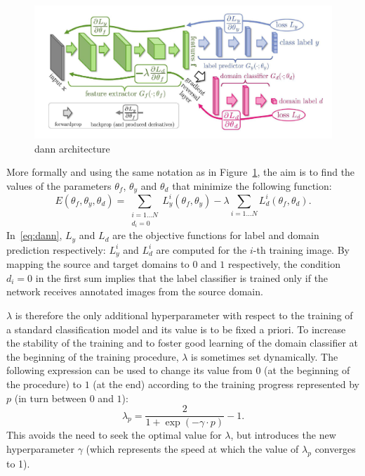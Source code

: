 \documentclass[%
    corpo=12pt,
    twoside,
    stile=classica,   
    tipotesi=magistrale,
    evenboxes,
    english,
	numerazioneromana,
]{toptesi}
\begin{document}
\begin{figure}[ht!]
	\centering
	\includegraphics[width=0.95\linewidth]{imgs/dann.png}
	\caption{\gls{dann} architecture\cite{ganin2015unsupervised}}
	\label{fig:dann}
\end{figure}

\medskip
More formally and using the same notation as in Figure~\ref{fig:dann}, the aim is to find the values of the parameters $\theta_f$, $\theta_y$ and $\theta_d$ that minimize the following function:
\begin{equation}
	E(\theta_f, \theta_y, \theta_d) = \sum_{
		\substack{i=1\ldots N\\d_i=0}
	}L^{i}_{y}\left(\theta_f, \theta_y\right) - 
	\lambda \sum_{i=1\ldots N}L^{i}_{d}\left(\theta_f, \theta_d\right).
	\label{eq:dann}
\end{equation}
In~\eqref{eq:dann}, $L_y$ and $L_d$ are the objective functions for label and domain prediction respectively: $L^{i}_{y}$ and $L^{i}_{d}$ are computed for the $i$-th training image. By mapping the source and target domains to $0$ and $1$ respectively, the condition $d_i=0$ in the first sum implies that the label classifier is trained only if the network receives annotated images from the source domain.

$\lambda$ is therefore the only additional hyperparameter with respect to the training of a standard classification model and its value is to be fixed a priori. To increase the stability of the training and to foster good learning of the domain classifier at the beginning of the training procedure, $\lambda$ is sometimes set dynamically. The following expression can be used to change its value from $0$ (at the beginning of the procedure) to $1$ (at the end) according to the training progress represented by $p$ (in turn between $0$ and $1$):
\begin{equation}
	\lambda_p = \frac{2}{1 + \exp{\left(-\gamma\cdot p\right)}} - 1.
	\label{eq:dynamic_lambda}
\end{equation}
This avoids the need to seek the optimal value for $\lambda$, but introduces the new hyperparameter $\gamma$ (which represents the speed at which the value of $\lambda_p$ converges to 1).
\end{document}
